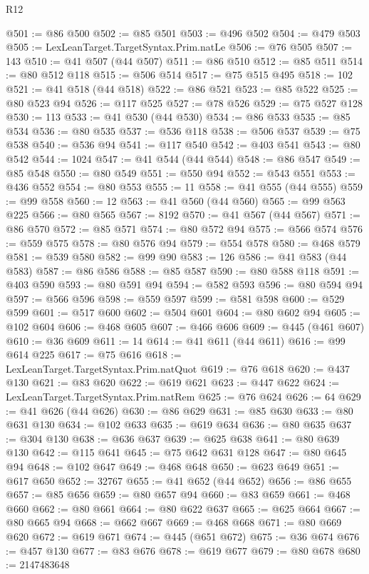 \begin{lexlean}{R12}
\begin{coremodule}
@501 := @86 @500
@502 := @85 @501
@503 := @496 @502
@504 := @479 @503
@505 := LexLeanTarget.TargetSyntax.Prim.natLe
@506 := @76 @505
@507 := 143
@510 := @41 @507 (@44 @507)
@511 := @86 @510
@512 := @85 @511
@514 := @80 @512 @118
@515 := @506 @514
@517 := @75 @515 @495
@518 := 102
@521 := @41 @518 (@44 @518)
@522 := @86 @521
@523 := @85 @522
@525 := @80 @523 @94
@526 := @117 @525
@527 := @78 @526
@529 := @75 @527 @128
@530 := 113
@533 := @41 @530 (@44 @530)
@534 := @86 @533
@535 := @85 @534
@536 := @80 @535
@537 := @536 @118
@538 := @506 @537
@539 := @75 @538
@540 := @536 @94
@541 := @117 @540
@542 := @403 @541
@543 := @80 @542
@544 := 1024
@547 := @41 @544 (@44 @544)
@548 := @86 @547
@549 := @85 @548
@550 := @80 @549
@551 := @550 @94
@552 := @543 @551
@553 := @436 @552
@554 := @80 @553
@555 := 11
@558 := @41 @555 (@44 @555)
@559 := @99 @558
@560 := 12
@563 := @41 @560 (@44 @560)
@565 := @99 @563 @225
@566 := @80 @565
@567 := 8192
@570 := @41 @567 (@44 @567)
@571 := @86 @570
@572 := @85 @571
@574 := @80 @572 @94
@575 := @566 @574
@576 := @559 @575
@578 := @80 @576 @94
@579 := @554 @578
@580 := @468 @579
@581 := @539 @580
@582 := @99 @90
@583 := 126
@586 := @41 @583 (@44 @583)
@587 := @86 @586
@588 := @85 @587
@590 := @80 @588 @118
@591 := @403 @590
@593 := @80 @591 @94
@594 := @582 @593
@596 := @80 @594 @94
@597 := @566 @596
@598 := @559 @597
@599 := @581 @598
@600 := @529 @599
@601 := @517 @600
@602 := @504 @601
@604 := @80 @602 @94
@605 := @102 @604
@606 := @468 @605
@607 := @466 @606
@609 := @445 (@461 @607)
@610 := @36 @609
@611 := 14
@614 := @41 @611 (@44 @611)
@616 := @99 @614 @225
@617 := @75 @616
@618 := LexLeanTarget.TargetSyntax.Prim.natQuot
@619 := @76 @618
@620 := @437 @130
@621 := @83 @620
@622 := @619 @621
@623 := @447 @622
@624 := LexLeanTarget.TargetSyntax.Prim.natRem
@625 := @76 @624
@626 := 64
@629 := @41 @626 (@44 @626)
@630 := @86 @629
@631 := @85 @630
@633 := @80 @631 @130
@634 := @102 @633
@635 := @619 @634
@636 := @80 @635
@637 := @304 @130
@638 := @636 @637
@639 := @625 @638
@641 := @80 @639 @130
@642 := @115 @641
@645 := @75 @642 @631 @128
@647 := @80 @645 @94
@648 := @102 @647
@649 := @468 @648
@650 := @623 @649
@651 := @617 @650
@652 := 32767
@655 := @41 @652 (@44 @652)
@656 := @86 @655
@657 := @85 @656
@659 := @80 @657 @94
@660 := @83 @659
@661 := @468 @660
@662 := @80 @661
@664 := @80 @622 @637
@665 := @625 @664
@667 := @80 @665 @94
@668 := @662 @667
@669 := @468 @668
@671 := @80 @669 @620
@672 := @619 @671
@674 := @445 (@651 @672)
@675 := @36 @674
@676 := @457 @130
@677 := @83 @676
@678 := @619 @677
@679 := @80 @678
@680 := 2147483648

\end{coremodule}
\end{lexlean}
